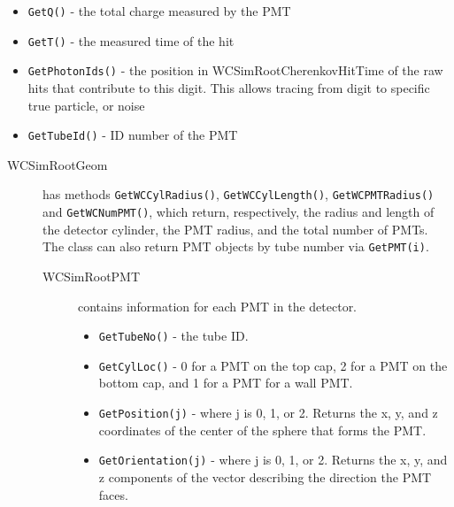 \begin{description}
\begin{description}
\begin{description}
          \begin{itemize}
          \item \texttt{GetQ()} - the total charge measured by the PMT
          \item \texttt{GetT()} - the measured time of the hit
          \item \texttt{GetPhotonIds()} - the position in WCSimRootCherenkovHitTime of the raw hits that contribute to this digit. This allows tracing from digit to specific true particle, or noise
          \item \texttt{GetTubeId()} - ID number of the PMT
          \end{itemize}
    \end{description}
  \end{description}
\end{description}


\begin{description}
  \item[WCSimRootGeom]  has methods \texttt{GetWCCylRadius()}, \texttt{GetWCCylLength()}, \texttt{GetWCPMTRadius()} and \texttt{GetWCNumPMT()}, which return, respectively, the radius and length of the detector cylinder, the PMT radius, and the total number of PMTs.  The class can also return PMT objects by tube number via \texttt{GetPMT(i)}.
    \begin{description}
    \item[WCSimRootPMT] contains information for each PMT in the detector.
    	\begin{itemize}
                \item \texttt{GetTubeNo()} - the tube ID.
		\item \texttt{GetCylLoc()} - 0 for a PMT on the top cap, 2 for a PMT on the bottom  cap, and 1 for a PMT for a wall PMT.
		\item \texttt{GetPosition(j)} - where j is 0, 1, or 2.  Returns the x, y, and z coordinates of the center of the sphere that forms the PMT.
		\item \texttt{GetOrientation(j)} - where j is 0, 1, or 2.  Returns the x, y, and z components of the vector describing the direction the PMT faces.
         \end{itemize}
    \end{description}
\end{description}

